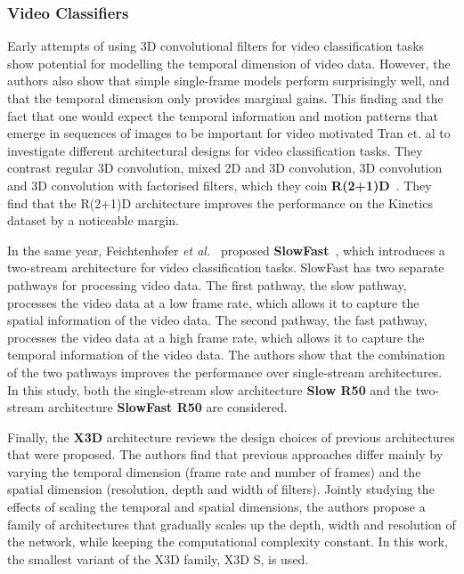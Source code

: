 \documentclass[a4paper]{article}
\begin{document}
\subsubsection{Video Classifiers} %

Early attempts of using 3D convolutional filters for video classification
tasks~\cite{i3d, c3d} show potential for modelling the temporal dimension of
video data. However, the authors also show that simple single-frame models
perform surprisingly well, and that the temporal dimension only provides
marginal gains. This finding and the fact that one would expect the temporal
information and motion patterns that emerge in sequences of images to be
important for video motivated Tran et. al to investigate different architectural
designs for video classification tasks. They contrast regular 3D convolution,
mixed 2D and 3D convolution, 3D convolution and 3D convolution with factorised
filters, which they coin \textbf{R(2+1)D}~\cite{r2plus1d}. They find that the
R(2+1)D architecture improves the performance on the Kinetics dataset by a
noticeable margin. 

In the same year, Feichtenhofer \textit{et al.}~\cite{slowfast} proposed
\textbf{SlowFast}~\cite{slowfast}, which introduces a two-stream architecture
for video classification tasks. SlowFast has two separate pathways for
processing video data. The first pathway, the slow pathway, processes the video
data at a low frame rate, which allows it to capture the spatial information of
the video data. The second pathway, the fast pathway, processes the video data
at a high frame rate, which allows it to capture the temporal information of the
video data. The authors show that the combination of the two pathways improves
the performance over single-stream architectures. In this study, both the
single-stream slow architecture \textbf{Slow R50} and the two-stream
architecture \textbf{SlowFast R50} are considered.

Finally, the \textbf{X3D} architecture reviews the design choices of previous
architectures that were proposed. The authors find that previous approaches
differ mainly by varying the temporal dimension (frame rate and number of
frames) and the spatial dimension (resolution, depth and width of filters).
Jointly studying the effects of scaling the temporal and spatial dimensions, the
authors propose a family of architectures that gradually scales up the depth,
width and resolution of the network, while keeping the computational complexity
constant. In this work, the smallest variant of the X3D family, X3D S,
is used.
\end{document}

